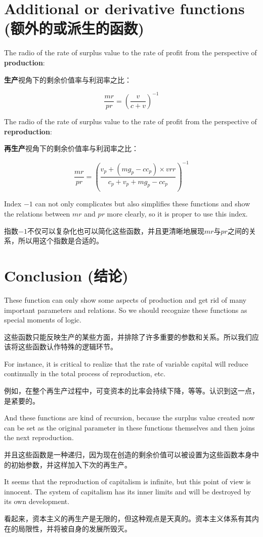 \documentclass[]{ctexart}
\begin{document}
\section{Additional or derivative functions (额外的或派生的函数)}

The radio of the rate of surplus value to the rate of profit from the perspective of \textbf{production}:

\textbf{生产}视角下的剩余价值率与利润率之比：

$$\frac{mr}{pr} = (\frac{v}{c + v})^{-1}$$

The radio of the rate of surplus value to the rate of profit from the perspective of \textbf{reproduction}:

\textbf{再生产}视角下的剩余价值率与利润率之比：

$$\frac{mr}{pr} = (\frac{v_p + (mg_p - cc_p) \times vrr}{c_p + v_p + mg_p - cc_p})^{-1}$$

Index $-1$ can not only complicates but also simplifies these functions and show the relations between $mr$ and $pr$ more clearly, so it is proper to use this index.

指数$-1$不仅可以复杂化也可以简化这些函数，并且更清晰地展现$mr$与$pr$之间的关系，所以用这个指数是合适的。

\section{Conclusion (结论)}

These function can only show some aspects of production and get rid of many important parameters and relations. So we should recognize these functions as special moments of logic.

这些函数只能反映生产的某些方面，并排除了许多重要的参数和关系。所以我们应该将这些函数认作特殊的逻辑环节。

For instance, it is critical to realize that the rate of variable capital will reduce continually in the total process of reproduction, etc.

例如，在整个再生产过程中，可变资本的比率会持续下降，等等。认识到这一点，是紧要的。


And these functions are kind of recursion, because the surplus value created now can be set as the original parameter in these functions themselves and then joins the next reproduction.

并且这些函数是一种递归，因为现在创造的剩余价值可以被设置为这些函数本身中的初始参数，并这样加入下次的再生产。

It seems that the reproduction of capitalism is infinite, but this point of view is innocent. The system of capitalism has its inner limits and will be destroyed by its own development.

看起来，资本主义的再生产是无限的，但这种观点是天真的。资本主义体系有其内在的局限性，并将被自身的发展所毁灭。

\end{document}
